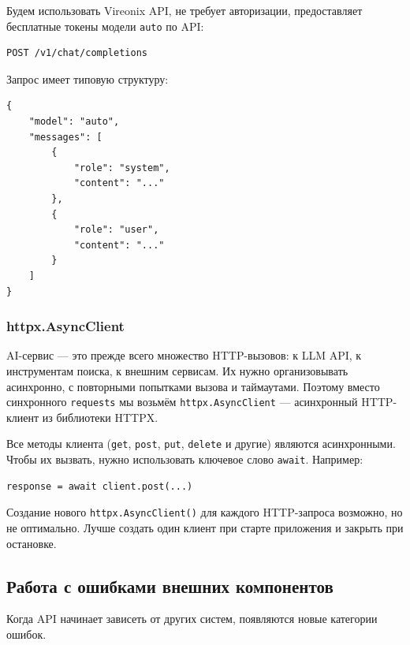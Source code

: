 \documentclass[12pt,a4paper]{article}
\begin{document}
Будем использовать Vireonix API, не требует авторизации, предоставляет бесплатные токены модели \texttt{auto} по API:

\begin{lstlisting}[caption={Endpoint LLM}]
POST /v1/chat/completions
\end{lstlisting}

Запрос имеет типовую структуру:

\begin{lstlisting}[caption={Структура запроса к LLM}]
{
    "model": "auto",
    "messages": [
        {
            "role": "system",
            "content": "..."
        },
        {
            "role": "user",
            "content": "..."
        }
    ]
}
\end{lstlisting}

\subsubsection{httpx.AsyncClient}

AI-сервис — это прежде всего множество HTTP-вызовов: к LLM API, к инструментам поиска, к внешним сервисам. Их нужно организовывать асинхронно, с повторными попытками вызова и таймаутами. Поэтому вместо синхронного \texttt{requests} мы возьмём \texttt{httpx.AsyncClient} — асинхронный HTTP-клиент из библиотеки HTTPX.

Все методы клиента (\texttt{get}, \texttt{post}, \texttt{put}, \texttt{delete} и другие) являются асинхронными. Чтобы их вызвать, нужно использовать ключевое слово \texttt{await}. Например:

\begin{lstlisting}[caption={Асинхронный вызов}]
response = await client.post(...)
\end{lstlisting}

Создание нового \texttt{httpx.AsyncClient()} для каждого HTTP-запроса возможно, но не оптимально. Лучше создать один клиент при старте приложения и закрыть при остановке.

\subsection{Работа с ошибками внешних компонентов}

Когда API начинает зависеть от других систем, появляются новые категории ошибок.
\end{document}
